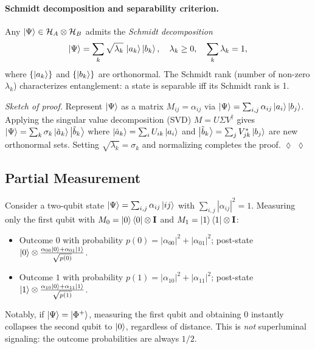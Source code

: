 \documentclass[aps, reprint, twocolumn, superscriptaddress, floatfix]{revtex4-2}
\newenvironment{proofsketch}[1][Sketch of proof]{%
  \par\smallskip\noindent\textit{#1.}\enspace}{%
  \hspace*{\fill}$\lozenge$\par\smallskip}
\begin{document}
\paragraph{Schmidt decomposition and separability criterion.}
Any $\ket{\Psi} \in \mathcal{H}_A \otimes \mathcal{H}_B$ admits the
\emph{Schmidt decomposition}
\begin{equation}
  \ket{\Psi} = \sum_k \sqrt{\lambda_k}\, \ket{a_k}\ket{b_k},
  \quad \lambda_k \ge 0,\quad \sum_k \lambda_k = 1,
  \label{eq:schmidt}
\end{equation}
where $\{\ket{a_k}\}$ and $\{\ket{b_k}\}$ are orthonormal.  The Schmidt rank
(number of non-zero $\lambda_k$) characterizes entanglement: a state is separable
iff its Schmidt rank is 1.

\begin{proofsketch}
Represent $\ket{\Psi}$ as a matrix $M_{ij} = \alpha_{ij}$ via
$\ket{\Psi}=\sum_{i,j}\alpha_{ij}\ket{a_i}\ket{b_j}$.  Applying the singular
value decomposition (SVD) $M = U\Sigma V^\dagger$ gives
$\ket{\Psi}=\sum_k \sigma_k \ket{\tilde{a}_k}\ket{\tilde{b}_k}$ where
$\ket{\tilde{a}_k}=\sum_i U_{ik}\ket{a_i}$ and
$\ket{\tilde{b}_k}=\sum_j V^*_{jk}\ket{b_j}$ are new orthonormal sets.
Setting $\sqrt{\lambda_k}=\sigma_k$ and normalizing completes the proof. $\lozenge$
\end{proofsketch}

\subsection{Partial Measurement}
\label{ssec:partial}

Consider a two-qubit state $\ket{\Psi} = \sum_{i,j} \alpha_{ij}\ket{ij}$ with
$\sum_{i,j}|\alpha_{ij}|^2=1$.  Measuring only the first qubit with
$M_0 = \ket{0}\bra{0}\otimes\mathbf{I}$ and $M_1 = \ket{1}\bra{1}\otimes\mathbf{I}$:
\begin{itemize}
  \item Outcome $0$ with probability
        $p(0) = |\alpha_{00}|^2 + |\alpha_{01}|^2$;
        post-state $\ket{0}\otimes\frac{\alpha_{00}\ket{0}+\alpha_{01}\ket{1}}{\sqrt{p(0)}}$.
  \item Outcome $1$ with probability
        $p(1) = |\alpha_{10}|^2 + |\alpha_{11}|^2$;
        post-state $\ket{1}\otimes\frac{\alpha_{10}\ket{0}+\alpha_{11}\ket{1}}{\sqrt{p(1)}}$.
\end{itemize}
Notably, if $\ket{\Psi}=\ket{\Phi^+}$, measuring the first qubit and obtaining
$0$ instantly collapses the second qubit to $\ket{0}$, regardless of distance.
This is \emph{not} superluminal signaling: the outcome probabilities are always $1/2$.
\end{document}
